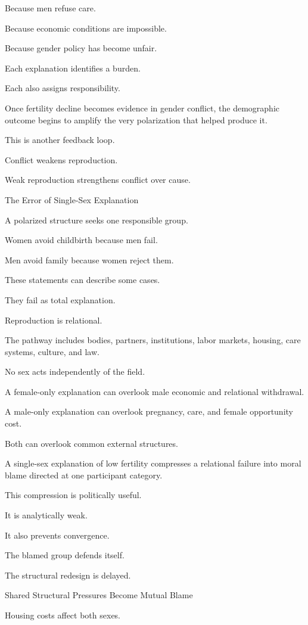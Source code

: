 Because men refuse care.

Because economic conditions are impossible.

Because gender policy has become unfair.

Each explanation identifies a burden.

Each also assigns responsibility.

Once fertility decline becomes evidence in gender conflict, the demographic outcome begins to amplify the very polarization that helped produce it.

This is another feedback loop.

Conflict weakens reproduction.

Weak reproduction strengthens conflict over cause.

The Error of Single-Sex Explanation

A polarized structure seeks one responsible group.

Women avoid childbirth because men fail.

Men avoid family because women reject them.

These statements can describe some cases.

They fail as total explanation.

Reproduction is relational.

The pathway includes bodies, partners, institutions, labor markets, housing, care systems, culture, and law.

No sex acts independently of the field.

A female-only explanation can overlook male economic and relational withdrawal.

A male-only explanation can overlook pregnancy, care, and female opportunity cost.

Both can overlook common external structures.

A single-sex explanation of low fertility compresses a relational failure into moral blame directed at one participant category.

This compression is politically useful.

It is analytically weak.

It also prevents convergence.

The blamed group defends itself.

The structural redesign is delayed.

Shared Structural Pressures Become Mutual Blame

Housing costs affect both sexes.

